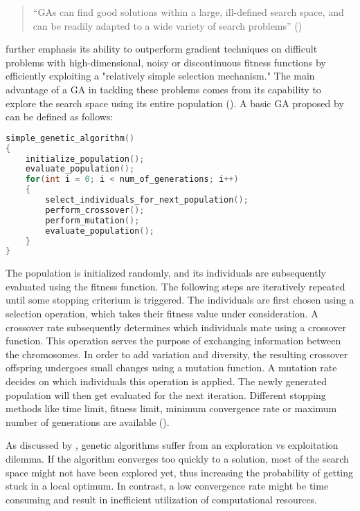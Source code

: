 \begin{quote}
	\begin{em}
		\enquote{GAs can find good solutions within a large, ill-defined search space, and can be readily adapted to a wide variety of search problems} (\cite{mills_determining_2015})
	\end{em}
\end{quote}

\cite{grefenstette_optimization_1986} further emphasis its ability to outperform gradient techniques on difficult problems with high-dimensional, noisy or discontinuous fitness functions by efficiently exploiting a "relatively simple selection mechanism." The main advantage of a GA in tackling these problems comes from its capability to explore the search space using its entire population (\cite{hussain_trade-off_2020}). A basic GA proposed by \cite{holland_adaptation_1992} can be defined as follows:

\begin{lstlisting}[language=C, tabsize=4]
simple_genetic_algorithm() 
{
	initialize_population();
	evaluate_population();
	for(int i = 0; i < num_of_generations; i++) 
	{
		select_individuals_for_next_population();
		perform_crossover();
		perform_mutation();
		evaluate_population();
	}
}
\end{lstlisting}

The population is initialized randomly, and its individuals are subsequently evaluated using the fitness function. The following steps are iteratively repeated until some stopping criterium is triggered. The individuals are first chosen using a selection operation, which takes their fitness value under consideration. A crossover rate subsequently determines which individuals mate using a crossover function. This operation serves the purpose of exchanging information between the chromosomes. In order to add variation and diversity, the resulting crossover offspring undergoes small changes using a mutation function. A mutation rate decides on which individuals this operation is applied. The newly generated population will then get evaluated for the next iteration. Different stopping methods like time limit, fitness limit, minimum convergence rate or maximum number of generations are available (\cite{majumdar_genetic_2015}).

As discussed by \cite{hussain_trade-off_2020}, genetic algorithms suffer from an exploration vs exploitation dilemma. If the algorithm converges too quickly to a solution, most of the search space might not have been explored yet, thus increasing the probability of getting stuck in a local optimum.
In contrast, a low convergence rate might be time consuming and result in inefficient utilization of computational resources.

